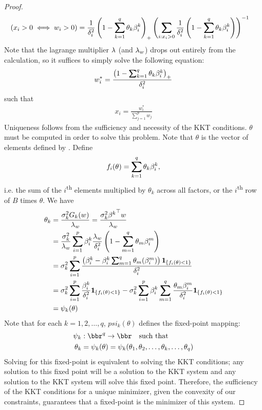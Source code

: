 \documentclass[12pt,leqno,letterpaper]{article}
\begin{document}
\begin{proof}
\begin{align}
(x_i >0 \iff w_i>0) &=\frac{1}{\gd_i^2}\paren{1 - \sum_{k=1}^q \theta_k \gb_i^k}_+ \paren{ \sum_{i:x_i>0} \frac{1}{\gd_i^2}\paren{1 - \sum_{k=1}^q \theta_k \gb_i^k}}^{-1}
\end{align}
Note that the lagrange multiplier $\lambda$ (and $\lambda_w$) drops out entirely from the calculation, so it suffices to simply solve the following equation:
\begin{align}
w_i^* = \frac{\left(1-\sum_{k=1}^q\theta_k \gb_i^k\right)_+}{\gd_i^2}
\end{align}
such that 
\begin{align}
x_i = \frac{w_i^*}{\sum_{j=1}^p w_j}
\end{align}
 Uniqueness follows from the sufficiency and necessity of the KKT conditions.  $\theta$ must be computed in order to solve this problem.  Note that $\theta$ is the vector of elements defined by .  
 Define
 \begin{align}
 f_i(\theta) = \sum_{k=1}^q \theta_k \gb_i^k,
 \end{align}
 i.e. the sum of the $i$\textsuperscript{th} elements multiplied by $\theta_k$ across all factors, or the $i$\textsuperscript{th} row of $B$ times $\theta$.
 We have
 \begin{align}
 \theta_k &= \frac{\gs_k^2 G_k(w)}{\gl_w}  = \frac{\gs_k^2 {\gb^k}^\T w}{\gl_w}\label{thetadef}\\
 & = \frac{\gs_k^2}{\gl_w} \sum_{i=1}^p \gb_i^k \frac{\gl_w}{\gd_i^2} \paren{1 - \sum_{m=1}^q \theta_m \gb_i^m}\\
 &= \gs_k^2 \sum_{i=1}^p \frac{\paren{\gb_i^k -\gb_i^k\sum_{m=1}^q \theta_m(\gb_i^m)}\inds{\{ f_i(\theta)<1 \}}}{\gd_i^2}\\
 &= \gs_k^2 \sum_{i=1}^p \frac{\gb_i^k}{\gd_i^2}\inds{\{ f_i(\theta)<1 \}} -\gs_k^2 \sum_{i=1}^p \gb_i^k\sum_{m=1}^q\frac{\theta_m \gb_i^m}{\gd_i^2}\inds{\{ f_i(\theta)<1 \}} \\
 &= \psi_k(\theta)
 \end{align}
Note that for each $k=1,2,\ldots,q$, $psi_k(\theta)$ defines the fixed-point mapping:
\begin{align*}
\psi_k &: \bbr^q \to \bbr \quad \text{such that}\\
\theta_k &= \psi_k(\theta) = \psi_k(\theta_1, \theta_2,\ldots,\theta_k,\ldots,\theta_q)
\end{align*}
Solving for this fixed-point is equivalent to solving the KKT conditions; any solution to this fixed point will be a solution to the KKT system and any solution to the KKT system will solve this fixed point.  Therefore, the sufficiency of the KKT conditions for a unique minimizer, given the convexity of our constraints, guarantees that a fixed-point is the minimizer of this system.

\end{proof}
\end{document}

